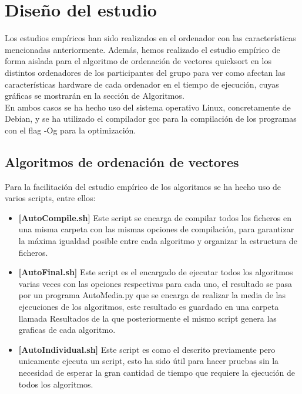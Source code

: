 \documentclass[11pt]{article}
\begin{document}
\section{Diseño del estudio}
    \newcommand{\mivar}{ordenación de vectores quicksort}
    Los estudios empíricos han sido realizados en el ordenador con las características mencionadas anteriormente.
    Además, hemos realizado el estudio empírico de forma aislada para el algoritmo de ordenación de vectores
    quicksort en los distintos ordenadores de los participantes del grupo para ver como afectan las características
    hardware de cada ordenador en el tiempo de ejecución, cuyas gráficas se mostrarán en la sección de Algoritmos. \\
    En ambos casos se ha hecho uso del sistema operativo Linux, concretamente de Debian, y se ha utilizado el
    compilador gcc para la compilación de los programas  con el flag -Og para la optimización.
    \subsection{Algoritmos de ordenación de vectores}
    Para la facilitación del estudio empírico de los algoritmos se ha hecho uso de varios scripts, entre ellos:
    \begin{itemize}
        \item \textbf{[AutoCompile.sh]} Este script se encarga de compilar todos los ficheros en una misma carpeta con las mismas
        opciones de compilación, para garantizar la máxima igualdad posible entre cada algoritmo y organizar la estructura de 
        ficheros.
        \item \textbf{[AutoFinal.sh]} Este script es el encargado de ejecutar todos los algoritmos varias veces con las opciones respectivas para cada uno,
        el resultado se pasa por un programa AutoMedia.py que se encarga de realizar la media de las ejecuciones de los algoritmos,
        este resultado es guardado en una carpeta llamada Resultados de la que posteriormente el mismo script genera las graficas
        de cada algoritmo.
        \item \textbf{[AutoIndividual.sh]} Este script es como el descrito previamente pero unicamente ejecuta un script, esto ha sido útil para hacer
        pruebas sin la necesidad de esperar la gran cantidad de tiempo que requiere la ejecución de todos los algoritmos.
    \end{itemize}
    
\end{document}
